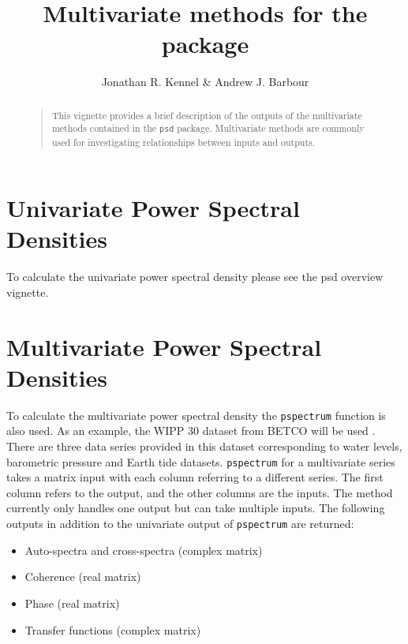 \documentclass[11pt]{article}\usepackage[]{graphicx}\usepackage[]{color}
\title{Multivariate methods for the \Rcmd{psd} package}
\author{Jonathan R. Kennel & Andrew J. Barbour}
\newcommand{\Rcmd}[1]{\texttt{#1}}
\begin{document}
\maketitle
%
\begin{abstract}
%
\begin{quote}
This vignette provides a brief description of the outputs of the multivariate methods contained in the \Rcmd{psd} package. Multivariate methods are commonly used for investigating relationships between inputs and outputs. 
\end{quote}
%
\end{abstract}

\tableofcontents
\clearpage

\section{Univariate Power Spectral Densities}

To calculate the univariate power spectral density please see the psd overview vignette. 




\section{Multivariate Power Spectral Densities}

To calculate the multivariate power spectral density the \Rcmd{pspectrum} function is also used. As an example, the WIPP 30 dataset from BETCO will be used \citet{Toll2007}. There are three data series provided in this dataset corresponding to water levels, barometric pressure and Earth tide datasets.  \Rcmd{pspectrum} for a multivariate series takes a matrix input with each column referring to a different series. The first column refers to the output, and the other columns are the inputs.  The method currently only handles one output but can take multiple inputs.  The following outputs in addition to the univariate output of \Rcmd{pspectrum} are returned:

\begin{itemize}
\item Auto-spectra and cross-spectra (complex matrix)
\item Coherence (real matrix)
\item Phase (real matrix)
\item Transfer functions (complex matrix)
\end{itemize}
\end{document}
